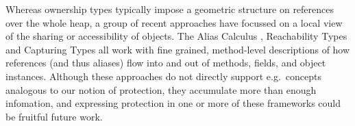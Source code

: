 Whereas ownership types typically impose a geometric structure 
on references over the whole heap, a group of recent approaches have 
focussed on a local view of the sharing or accessibility of objects.
The Alias
Calculus \cite{meyer-alias-calculus-scp2015,meyer-auto-alias-sncs2020},
Reachability
Types \cite{romf-reachability-types-oopsla2021,rompf-poly-reachability-oopsla2024}
and Capturing
Types \cite{odersky-capturing-types-toplas2023,scoped-effects-oopsla2022,odersky-reach-prog2024}
all work with fine grained, method-level descriptions of how
references (and thus aliases) flow into and out of methods, fields,
and object instances. Although these approaches do not directly
support e.g.\ concepts analogous to our notion of protection,
they accumulate more than enough infomation, and expressing protection
in one or more of these frameworks could be fruitful future work.


